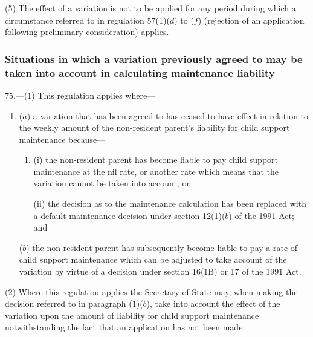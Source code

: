 \documentclass[12pt,a4paper]{article}
\begin{document}
(5) The effect of a variation is not to be applied for any period during which a circumstance referred to in regulation 57(1)($d$)  to ($f$)  (rejection of an application following preliminary consideration) applies.


\subsubsection[75. Situations in which a variation previously agreed to may be taken into account in calculating maintenance liability]{Situations in which a variation previously agreed to may be taken into account in calculating maintenance liability}

75.---(1)  This regulation applies where—
\begin{enumerate}\item[]
($a$) a variation that has been agreed to has ceased to have effect in relation to the weekly amount of the non-resident parent’s liability for child support maintenance because—
\begin{enumerate}\item[]
(i) the non-resident parent has become liable to pay child support maintenance at the nil rate, or another rate which means that the variation cannot be taken into account; or

(ii) the decision as to the maintenance calculation has been replaced with a default maintenance decision under section 12(1)($b$)  of the 1991 Act; and
\end{enumerate}

($b$) the non-resident parent has subsequently become liable to pay a rate of child support maintenance which can be adjusted to take account of the variation by virtue of a decision under section 16(1B) or 17 of the 1991 Act.
\end{enumerate}

(2) Where this regulation applies 
the Secretary of State may, when making the decision referred to in paragraph (1)($b$), take into account the effect of the variation upon the amount of liability for child support maintenance notwithstanding the fact that an application has not been made.
\end{document}

